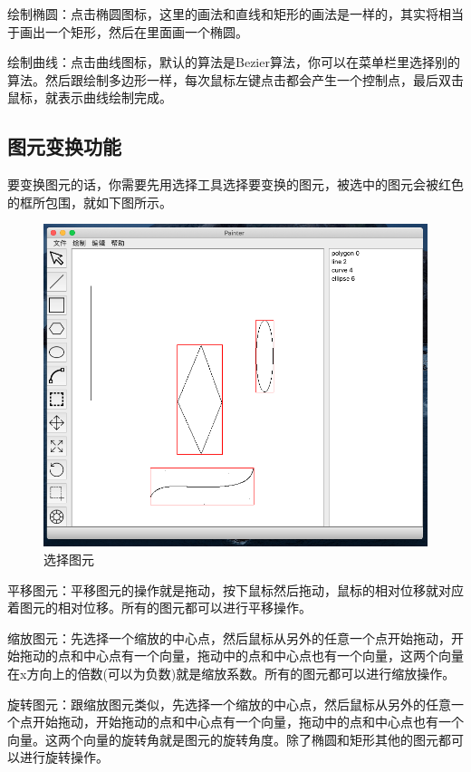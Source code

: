 \documentclass[11pt, a4paper, UTF8]{ctexart}
\begin{document}
绘制椭圆：点击椭圆图标，这里的画法和直线和矩形的画法是一样的，其实将相当于画出一个矩形，然后在里面画一个椭圆。

绘制曲线：点击曲线图标，默认的算法是Bezier算法，你可以在菜单栏里选择别的算法。然后跟绘制多边形一样，每次鼠标左键点击都会产生一个控制点，最后双击鼠标，就表示曲线绘制完成。

\subsection{图元变换功能}

要变换图元的话，你需要先用选择工具选择要变换的图元，被选中的图元会被红色的框所包围，就如下图所示。

\begin{figure}[H]
    \centering
    \includegraphics[scale=0.5]{select.png}
    \caption{选择图元}
\end{figure}

平移图元：平移图元的操作就是拖动，按下鼠标然后拖动，鼠标的相对位移就对应着图元的相对位移。所有的图元都可以进行平移操作。

缩放图元：先选择一个缩放的中心点，然后鼠标从另外的任意一个点开始拖动，开始拖动的点和中心点有一个向量，拖动中的点和中心点也有一个向量，这两个向量在x方向上的倍数(可以为负数)就是缩放系数。所有的图元都可以进行缩放操作。

旋转图元：跟缩放图元类似，先选择一个缩放的中心点，然后鼠标从另外的任意一个点开始拖动，开始拖动的点和中心点有一个向量，拖动中的点和中心点也有一个向量。这两个向量的旋转角就是图元的旋转角度。除了椭圆和矩形其他的图元都可以进行旋转操作。
\end{document}
